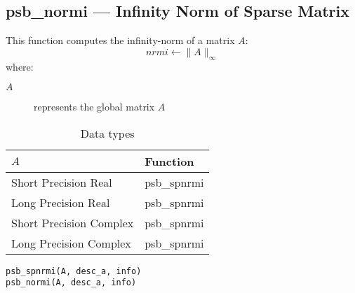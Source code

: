 %
%


\clearpage\subsection{psb\_normi --- Infinity Norm of Sparse Matrix}

This function computes the infinity-norm of a matrix $A$:\\

\[ nrmi \leftarrow \|A\|_\infty \]
where:
\begin{description}
\item[$A$] represents the global matrix $A$
\end{description}

\begin{table}[h]
\begin{center}
\begin{tabular}{ll}
\hline
$A$ & {\bf Function}\\
\hline
Short Precision Real & psb\_spnrmi \\
Long Precision Real & psb\_spnrmi \\
Short Precision Complex & psb\_spnrmi \\
Long Precision Complex & psb\_spnrmi \\
\hline
\end{tabular}
\end{center}
\caption{Data types\label{tab:f90nrmi}}
\end{table}

\begin{verbatim}
psb_spnrmi(A, desc_a, info)
psb_normi(A, desc_a, info)
\end{verbatim}


